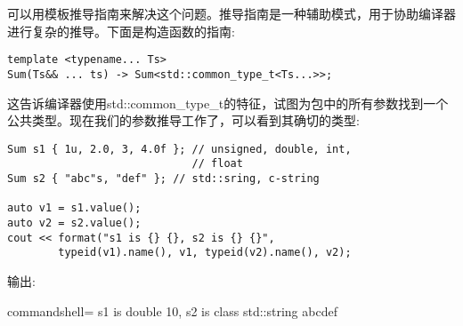 可以用模板推导指南来解决这个问题。推导指南是一种辅助模式，用于协助编译器进行复杂的推导。下面是构造函数的指南:

\begin{lstlisting}[style=styleCXX]
template <typename... Ts>
Sum(Ts&& ... ts) -> Sum<std::common_type_t<Ts...>>;
\end{lstlisting}

这告诉编译器使用std::common\_type\_t的特征，试图为包中的所有参数找到一个公共类型。现在我们的参数推导工作了，可以看到其确切的类型:

\begin{lstlisting}[style=styleCXX]
Sum s1 { 1u, 2.0, 3, 4.0f }; // unsigned, double, int,
							 // float
Sum s2 { "abc"s, "def" }; // std::sring, c-string

auto v1 = s1.value();
auto v2 = s2.value();
cout << format("s1 is {} {}, s2 is {} {}",
		typeid(v1).name(), v1, typeid(v2).name(), v2);
\end{lstlisting}

输出:

\begin{tcblisting}{commandshell={}}
s1 is double 10, s2 is class std::string abcdef
\end{tcblisting}



